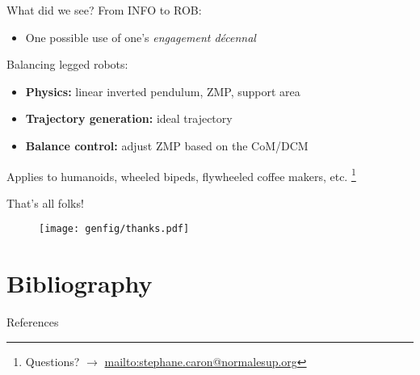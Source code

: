 \documentclass[9pt, aspectratio=43]{beamer}
\newcommand\blfootnote[1]{%
  \begingroup
  \renewcommand\thefootnote{}%
  \footnote{#1}%
  \addtocounter{footnote}{-1}%
  \endgroup
}
\begin{document}

\begin{frame}{What did we see?}
    From INFO to ROB:
    \begin{itemize}
        \item One possible use of one's \emph{engagement d\'{e}cennal}
    \end{itemize}
    Balancing legged robots:
    \begin{itemize}
        \item \textbf{Physics:} linear inverted pendulum, ZMP, support area
        \item \textbf{Trajectory generation:} ideal trajectory
        \item \textbf{Balance control:} adjust ZMP based on the CoM/DCM
    \end{itemize}
    Applies to humanoids, wheeled bipeds, flywheeled coffee makers, etc.
    \blfootnote{
        Questions? $\to$ \url{mailto:stephane.caron@normalesup.org}
    }
\end{frame}

\begin{frame}{That's all folks!}
    \vspace{2em}
    \begin{figure}
        \centering
        \texttt{[image: genfig/thanks.pdf]}
    \end{figure}
\end{frame}


\section*{Bibliography}


\renewcommand*{\bibfont}{\footnotesize}

\begin{frame}[allowframebreaks]{References}
    \printbibliography[heading=none]
\end{frame}

\end{document}

